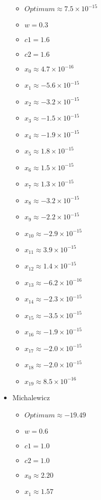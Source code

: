 \documentclass[hidelinks,english,conference]{IEEEtran}
\begin{document}
\begin{itemize}
		\begin{itemize}
			\item $Optimum \approx 7.5 \times 10^{-15}$
			\item $w = 0.3$
			\item $c1 = 1.6$
			\item $c2 = 1.6$
			\item $x_{0} \approx 4.7 \times 10^{-16}$
			\item $x_{1} \approx -5.6 \times 10^{-15}$
			\item $x_{2} \approx -3.2 \times 10^{-15}$
			\item $x_{3} \approx -1.5 \times 10^{-15}$
			\item $x_{4} \approx -1.9 \times 10^{-15}$
			\item $x_{5} \approx 1.8 \times 10^{-15}$
			\item $x_{6} \approx 1.5 \times 10^{-15}$
			\item $x_{7} \approx 1.3 \times 10^{-15}$
			\item $x_{8} \approx -3.2 \times 10^{-15}$
			\item $x_{9} \approx -2.2 \times 10^{-15}$
			\item $x_{10} \approx -2.9 \times 10^{-15}$
			\item $x_{11} \approx 3.9 \times 10^{-15}$
			\item $x_{12} \approx 1.4 \times 10^{-15}$
			\item $x_{13} \approx -6.2 \times 10^{-16}$
			\item $x_{14} \approx -2.3 \times 10^{-15}$
			\item $x_{15} \approx -3.5 \times 10^{-15}$
			\item $x_{16} \approx -1.9 \times 10^{-15}$
			\item $x_{17} \approx -2.0 \times 10^{-15}$
			\item $x_{18} \approx -2.0 \times 10^{-15}$
			\item $x_{19} \approx 8.5 \times 10^{-16}$
		\end{itemize}
	\item Michalewicz\\
		\begin{itemize}
			\item $Optimum \approx -19.49$
			\item $w = 0.6$
			\item $c1 = 1.0$
			\item $c2 = 1.0$
			\item $x_{0} \approx 2.20$
			\item $x_{1} \approx 1.57$

\end{itemize}
\end{itemize}
\end{document}
